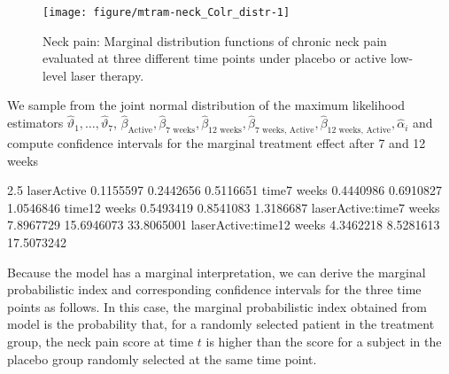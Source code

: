 \documentclass[article,nojss,shortnames]{jss}\usepackage[]{graphicx}\usepackage[]{xcolor}
\newcommand{\eparm}{\vartheta}
\newcommand{\eshiftparm}{\beta}
\begin{document}
\begin{figure}[t]
\begin{Schunk}


{\centering \texttt{[image: figure/mtram-neck\_Colr\_distr-1]} 

}

\end{Schunk}
\caption{Neck pain: Marginal distribution functions of chronic neck pain
         evaluated at three different time points under placebo or active
         low-level laser therapy. \label{fig:distr_pain}}
\end{figure}
We sample from the joint normal distribution of the maximum likelihood estimators
$\hat{\eparm}_1, \dots, \hat{\eparm}_7$, $\hat{\eshiftparm}_\text{Active},
\hat{\eshiftparm}_\text{7 weeks}, \hat{\eshiftparm}_\text{12 weeks},
\hat{\eshiftparm}_\text{7 weeks, Active},
\hat{\eshiftparm}_\text{12 weeks, Active}, \hat{\alpha}_i$
and compute confidence intervals for the marginal treatment
effect after 7 and 12 weeks
\begin{Schunk}
\begin{Soutput}
                              2.5%        50%      97.5%
laserActive              0.1155597  0.2442656  0.5116651
time7 weeks              0.4440986  0.6910827  1.0546846
time12 weeks             0.5493419  0.8541083  1.3186687
laserActive:time7 weeks  7.8967729 15.6946073 33.8065001
laserActive:time12 weeks 4.3462218  8.5281613 17.5073242
\end{Soutput}
\end{Schunk}

Because the model  has a marginal interpretation, we can
derive the marginal probabilistic index and corresponding confidence intervals 
for the three time points as follows. In this case, the marginal probabilistic
index obtained from model  is the probability that,
for a randomly selected patient in the treatment group, the neck pain score at 
time $t$ is higher than the score for a subject in the placebo group randomly 
selected at the same time point. 
\end{document}
